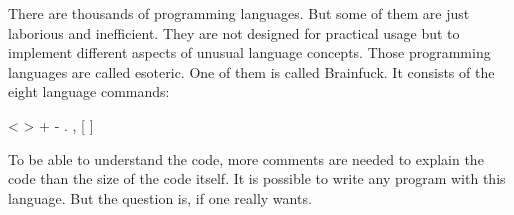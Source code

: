
There are thousands of programming languages. But some of them are just laborious and inefficient. They are not designed for practical usage but to implement different aspects of unusual language concepts. Those programming languages are called esoteric. One of them is called Brainfuck. It consists of the eight language commands:

\textless{} \textgreater{} + - . , {[} {]}

To be able to understand the code, more comments are needed to explain the code than the size of the code itself.
It is possible to write any program with this language. But the question is, if one really wants.

